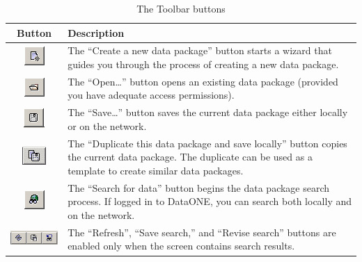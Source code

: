 \begin{table}[ht]
  \centering
  \begin{tabular}{|c|m{}|}
  \hline
  \textbf{Button} & \textbf{Description} \\
  \hline
  \includegraphics[scale=0.7]{images/button-new-dp.png} &
  The ``Create a new data package'' button starts a wizard that guides
  you through the process of creating a new data package. \\
  \hline
  \includegraphics[scale=0.7]{images/button-open.png} &
  The ``Open\ldots'' button opens an existing data package (provided you
  have adequate access permissions). \\
  \hline
  \includegraphics[scale=0.7]{images/button-save.png} &
  The ``Save\ldots'' button saves the current data package either
  locally or on the network. \\
  \hline
  \includegraphics[scale=0.7]{images/button-duplicate.png} &
  The ``Duplicate this data package and save locally'' button copies the
  current data package. The duplicate can be used as a template to
  create similar data packages. \\
  \hline
  \includegraphics[scale=0.7]{images/button-search.png} &
  The ``Search for data'' button begins the data package search process.
  If logged in to DataONE, you can search both locally and on the 
  network. \\
  \hline
  \includegraphics[scale=0.7]{images/button-bar-search.png} &
  The ``Refresh'', ``Save search,'' and ``Revise search'' buttons are
  enabled only when the screen contains search results. \\
  \hline
  \end{tabular}
  \caption{The Toolbar buttons}
  \label{tab:button-bar}
\end{table}


